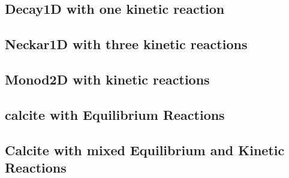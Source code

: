 \subsection{Decay1D with one kinetic reaction}

\subsection{Neckar1D with three kinetic reactions}

\subsection{Monod2D with kinetic reactions}

\subsection{calcite with Equilibrium Reactions}

\subsection{Calcite with mixed Equilibrium and Kinetic Reactions}
